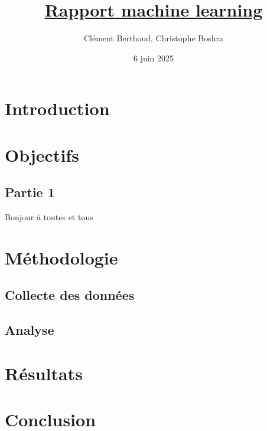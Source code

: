 \documentclass[12pt]{report}  %
\title{
  \vspace{2cm}
  \textbf{\uline{\Huge Rapport machine learning}}\\[1cm]
}
\author{\Large Clément Berthoud, Christophe Boshra}
\date{6 juin 2025}
\begin{document}
\maketitle

\tableofcontents
\newpage

\chapter{Introduction}
\vspace{4cm}

\chapter{Objectifs}
\section{Partie 1}
\vspace{0cm}

Bonjour à toutes et tous 


\chapter{Méthodologie}
\section{Collecte des données}
\vspace{4cm}

\section{Analyse}
\vspace{4cm}

\chapter{Résultats}
\vspace{4cm}

\chapter{Conclusion}
\vspace{4cm}
\end{document}
